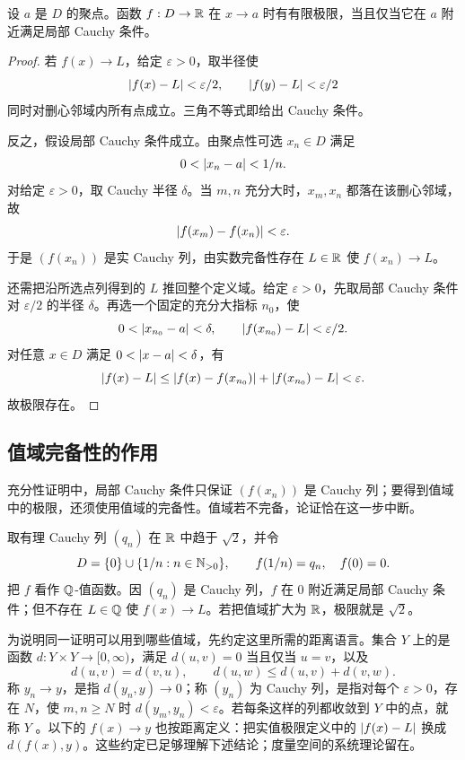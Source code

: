 \begin{theorem}
设 \(a\) 是 \(D\) 的聚点。函数 \(f:D\to\mathbb{R}\) 在 \(x\to a\) 时有有限极限，当且仅当它在 \(a\) 附近满足局部 Cauchy 条件。
\end{theorem}

\begin{proof}
若 \(f(x)\to L\)，给定 \(\varepsilon>0\)，取半径使
\[
 \left|f(x)-L\right|<\varepsilon/2,\qquad
 \left|f(y)-L\right|<\varepsilon/2
\]
同时对删心邻域内所有点成立。三角不等式即给出 Cauchy 条件。

反之，假设局部 Cauchy 条件成立。由聚点性可选 \(x_n\in D\) 满足
\[
 0<\left|x_n-a\right|<1/n.
\]
对给定 \(\varepsilon>0\)，取 Cauchy 半径 \(\delta\)。当 \(m,n\) 充分大时，\(x_m,x_n\) 都落在该删心邻域，故
\[
 \left|f(x_m)-f(x_n)\right|<\varepsilon.
\]
于是 \((f(x_n))\) 是实 Cauchy 列，由实数完备性存在 \(L\in\mathbb{R}\) 使 \(f(x_n)\to L\)。

还需把沿所选点列得到的 \(L\) 推回整个定义域。给定 \(\varepsilon>0\)，先取局部 Cauchy 条件对 \(\varepsilon/2\) 的半径 \(\delta\)。再选一个固定的充分大指标 \(n_0\)，使
\[
 0<\left|x_{n_0}-a\right|<\delta,\qquad
 \left|f(x_{n_0})-L\right|<\varepsilon/2.
\]
对任意 \(x\in D\) 满足 \(0<\left|x-a\right|<\delta\)，有
\[
 \left|f(x)-L\right|
 \le\left|f(x)-f(x_{n_0})\right|+\left|f(x_{n_0})-L\right|
 <\varepsilon.
\]
故极限存在。
\end{proof}

\subsection{值域完备性的作用}

充分性证明中，局部 Cauchy 条件只保证 \((f(x_n))\) 是 Cauchy 列；要得到值域中的极限，还须使用值域的完备性。值域若不完备，论证恰在这一步中断。

\begin{counterexample}[有理值函数]
取有理 Cauchy 列 \((q_n)\) 在 \(\mathbb{R}\) 中趋于 \(\sqrt2\)，并令
\[
 D=\{0\}\cup\{1/n:n\in\mathbb{N}_{>0}\},\qquad f(1/n)=q_n,\quad f(0)=0.
\]
把 \(f\) 看作 \(\mathbb{Q}\)-值函数。因 \((q_n)\) 是 Cauchy 列，\(f\) 在 \(0\) 附近满足局部 Cauchy 条件；但不存在 \(L\in\mathbb{Q}\) 使 \(f(x)\to L\)。若把值域扩大为 \(\mathbb{R}\)，极限就是 \(\sqrt2\)。
\end{counterexample}

为说明同一证明可以用到哪些值域，先约定这里所需的距离语言。集合 \(Y\) 上的是函数 \(d:Y\times Y\to[0,\infty)\)，满足 \(d(u,v)=0\) 当且仅当 \(u=v\)，以及
\[
 d(u,v)=d(v,u),\qquad d(u,w)\le d(u,v)+d(v,w).
\]
称 \(y_n\to y\)，是指 \(d(y_n,y)\to0\)；称 \((y_n)\) 为 Cauchy 列，是指对每个 \(\varepsilon>0\)，存在 \(N\)，使 \(m,n\ge N\) 时 \(d(y_m,y_n)<\varepsilon\)。若每条这样的列都收敛到 \(Y\) 中的点，就称 \(Y\) 。以下的 \(f(x)\to y\) 也按距离定义：把实值极限定义中的 \(\left|f(x)-L\right|\) 换成 \(d(f(x),y)\)。这些约定已足够理解下述结论；度量空间的系统理论留在。

